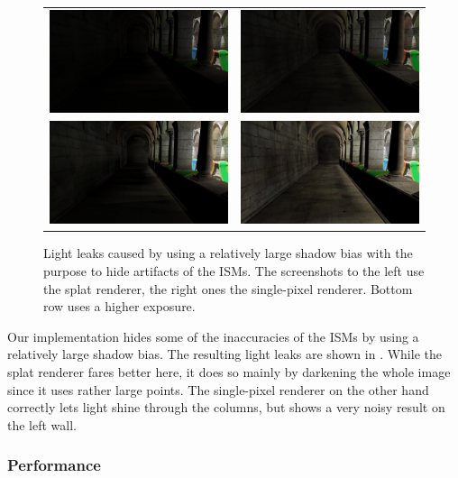  \begin{figure}[htb]
 \centering
   \begin{tabular}{@{}cc@{}}
     \includegraphics[width=.22\textwidth]{../screenshots/bias_splat} &
     \includegraphics[width=.22\textwidth]{../screenshots/bias_single_pixel}\\
       \includegraphics[width=.22\textwidth]{../screenshots/bias_splat_exposure} &
       \includegraphics[width=.22\textwidth]{../screenshots/bias_single_pixel_exposure}
   \end{tabular}
   \caption{Light leaks caused by using a relatively large shadow bias with the purpose to hide artifacts of the ISMs. The screenshots to the left use the splat renderer, the right ones the single-pixel renderer. Bottom row uses a higher exposure.}
   \label{fig:results:bias}
 \end{figure}

 Our implementation hides some of the inaccuracies of the ISMs by using a relatively large shadow bias. The resulting light leaks are shown in . While the splat renderer fares better here, it does so mainly by darkening the whole image since it uses rather large points. The single-pixel renderer on the other hand correctly lets light shine through the columns, but shows a very noisy result on the left wall.















 \subsubsection{Performance}

